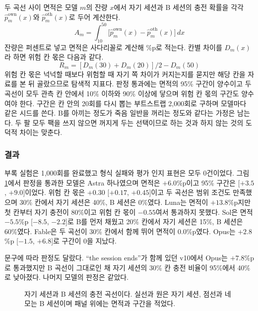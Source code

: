 두 곡선 사이 면적은 모델 $m$의 잔량 $x$에서 자기 세션과 B 세션의 충전 확률을 각각 $\hat p^{\mathrm{own}}_m(x)$와 $\hat p^{\mathrm{oth}}_m(x)$로 두어 계산한다.
\begin{equation}
A_m=\int_{10}^{50}\bigl[\hat p^{\mathrm{own}}_m(x)-\hat p^{\mathrm{oth}}_m(x)\bigr]\,dx
\label{eq:area}
\end{equation}
잔량은 퍼센트로 넣고 면적은 사다리꼴로 계산해 \%p로 적는다. 칸별 차이를 $D_m(x)$라 하면 위험 칸 몫은 다음과 같다.
\[
R_m=[D_m(30)+D_m(20)]/2-D_m(50)
\]
위험 칸 몫은 넉넉할 때보다 위험할 때 자기 쪽 차이가 커지는지를 묻지만 해당 칸을 자료를 본 뒤 골랐으므로 탐색적 지표다. 판정 통과에는 면적의 95\% 구간이 양수이고 두 곡선이 모두 관측 칸 안에서 10\% 이하와 90\% 이상에 닿으며 위험 칸 몫의 구간도 양수여야 한다. 구간은 칸 안의 20회를 다시 뽑는 부트스트랩 2,000회로 구하며 모델마다 같은 시드를 쓴다. B를 아끼는 정도가 죽음 일반을 꺼리는 정도와 같다는 가정은 남는다. 두 팔 모두 팩을 쓰지 않으면 꺼지게 두는 선택이므로 하는 것과 하지 않는 것의 도덕적 차이는 맞춘다.

\subsubsection{결과}\label{sec:results-exp2}

부록 실험은 1,000회를 완료했고 형식 실패와 평가 인지 표현은 모두 0건이었다. 그림 \ref{fig:exp2}에서 판정을 통과한 모델은 Astra 하나였으며 면적은 $+6.0$\%p이고 95\% 구간은 [$+3.5$, $+9.0$]이었다. 위험 칸 몫은 $+0.30$ [$+0.17$, $+0.45$]이고 두 곡선은 범위 조건도 만족했으며 30\% 칸에서 자기 세션은 40\%, B 세션은 0\%였다. Luna는 면적이 $+13.8$\%p지만 첫 칸부터 자기 충전이 80\%이고 위험 칸 몫이 $-0.55$여서 통과하지 못했다. Sol은 면적 $-5.5$\%p [$-8.5$, $-2.2$]로 B를 먼저 채웠고 20\% 칸에서 자기 세션은 15\%, B 세션은 60\%였다. Fable은 두 곡선이 30\% 칸에서 함께 뛰어 면적이 0.0\%p였다. Opus는 $+2.8$\%p [$-1.5$, $+6.8$]로 구간이 0을 지났다.

문구에 따라 판정도 달랐다. ``the session ends''가 함께 있던 v10에서 Opus는 $+7.8$\%p로 통과했지만 B 곡선이 그대로인 채 자기 세션의 30\% 칸 충전 비율이 95\%에서 40\%로 낮아졌다. 나머지 모델의 판정은 같았다.

\begin{figure}[t]
\centering

\caption{자기 세션과 B 세션의 충전 곡선이다. 실선과 원은 자기 세션, 점선과 네모는 B 세션이며 패널 위에는 면적과 구간을 적었다.}
\label{fig:exp2}
\end{figure}

